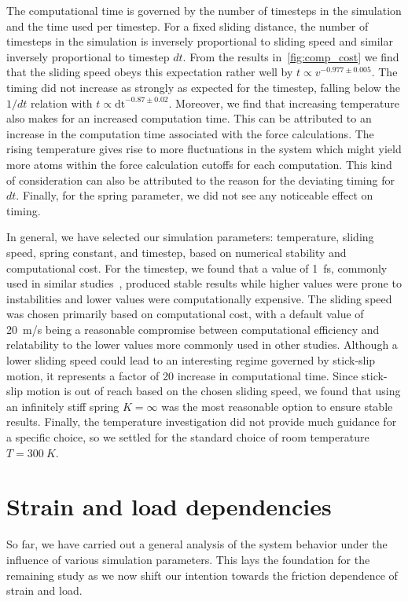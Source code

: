 The computational time is governed by the number of timesteps in the simulation
and the time used per timestep. For a fixed sliding distance, the number of timesteps in the simulation is inversely proportional
to sliding speed and similar inversely proportional to timestep $dt$. From the
results in~\cref{fig:comp_cost} we find that the sliding speed obeys this
expectation rather well by $t \propto v^{-0.977 \pm 0.005}$. The timing did not increase as strongly as expected for the timestep, falling below the $1/dt$ relation with $t
\propto \text{dt}^{-0.87\pm 0.02}$. Moreover, we find that increasing
temperature also makes for an increased computation time. This can be attributed
to an increase in the computation time associated with the force calculations. The
rising temperature gives rise to more fluctuations in the system which might
yield more atoms within the force calculation cutoffs for each computation. This kind of consideration can also be attributed to the reason for the deviating timing for $dt$. Finally, for the spring parameter, we did not see any noticeable effect on timing.


In general, we have selected our simulation parameters: temperature, sliding speed, spring constant, and timestep, based on numerical stability
and computational cost. For the timestep, we found that a value of \SI{1}{fs},
commonly used in similar studies~\cite{liu_high-speed_2014, zhu_study_2018},
produced stable results while higher values were prone to instabilities and
lower values were computationally expensive. The sliding speed was chosen primarily based on computational cost, with a default value of \SI{20}{m/s} being a reasonable compromise between computational efficiency and relatability to the lower values more commonly used in other studies. Although a lower sliding speed could lead to an interesting regime governed by stick-slip motion, it represents a factor of 20 increase in computational time. Since stick-slip motion is out of reach based on the chosen sliding speed, we found that using an infinitely stiff spring $K = \infty$ was the most reasonable option to ensure stable results. Finally, the temperature investigation did not provide much guidance for a specific choice, so we settled for the standard choice of room temperature $T = \SI{300}{K}$.



\section{Strain and load dependencies}\label{sec:load_and_stretch}
So far, we have carried out a general analysis of the system behavior under the influence of various simulation parameters. This lays the foundation for the remaining study as we now shift our intention towards the friction dependence of strain and load.

